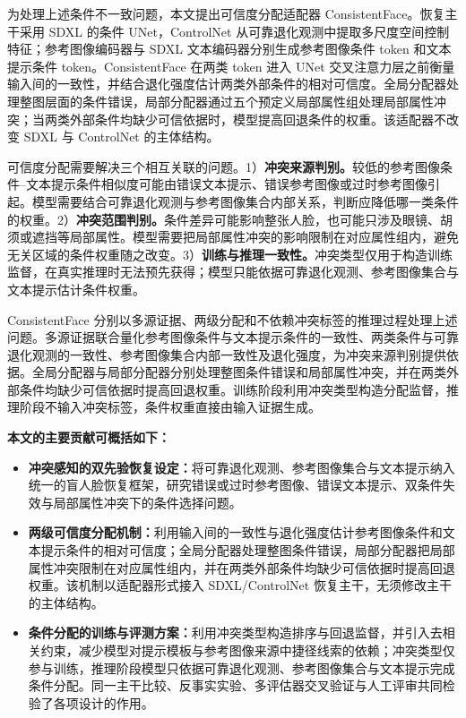 \documentclass[journal]{IEEEtran}
\begin{document}
为处理上述条件不一致问题，本文提出可信度分配适配器 ConsistentFace。恢复主干采用 SDXL 的条件 UNet，ControlNet 从可靠退化观测中提取多尺度空间控制特征；参考图像编码器与 SDXL 文本编码器分别生成参考图像条件 token 和文本提示条件 token。ConsistentFace 在两类 token 进入 UNet 交叉注意力层之前衡量输入间的一致性，并结合退化强度估计两类外部条件的相对可信度。全局分配器处理整图层面的条件错误，局部分配器通过五个预定义局部属性组处理局部属性冲突；当两类外部条件均缺少可信依据时，模型提高回退条件的权重。该适配器不改变 SDXL 与 ControlNet 的主体结构。

可信度分配需要解决三个相互关联的问题。1）\textbf{冲突来源判别。}较低的参考图像条件--文本提示条件相似度可能由错误文本提示、错误参考图像或过时参考图像引起。模型需要结合可靠退化观测与参考图像集合内部关系，判断应降低哪一类条件的权重。2）\textbf{冲突范围判别。}条件差异可能影响整张人脸，也可能只涉及眼镜、胡须或遮挡等局部属性。模型需要把局部属性冲突的影响限制在对应属性组内，避免无关区域的条件权重随之改变。3）\textbf{训练与推理一致性。}冲突类型仅用于构造训练监督，在真实推理时无法预先获得；模型只能依据可靠退化观测、参考图像集合与文本提示估计条件权重。

ConsistentFace 分别以多源证据、两级分配和不依赖冲突标签的推理过程处理上述问题。多源证据联合量化参考图像条件与文本提示条件的一致性、两类条件与可靠退化观测的一致性、参考图像集合内部一致性及退化强度，为冲突来源判别提供依据。全局分配器与局部分配器分别处理整图条件错误和局部属性冲突，并在两类外部条件均缺少可信依据时提高回退权重。训练阶段利用冲突类型构造分配监督，推理阶段不输入冲突标签，条件权重直接由输入证据生成。

\textbf{本文的主要贡献可概括如下：}

\begin{itemize}
    \item \textbf{冲突感知的双先验恢复设定：}将可靠退化观测、参考图像集合与文本提示纳入统一的盲人脸恢复框架，研究错误或过时参考图像、错误文本提示、双条件失效与局部属性冲突下的条件选择问题。

    \item \textbf{两级可信度分配机制：}利用输入间的一致性与退化强度估计参考图像条件和文本提示条件的相对可信度；全局分配器处理整图条件错误，局部分配器把局部属性冲突限制在对应属性组内，并在两类外部条件均缺少可信依据时提高回退权重。该机制以适配器形式接入 SDXL/ControlNet 恢复主干，无须修改主干的主体结构。

    \item \textbf{条件分配的训练与评测方案：}利用冲突类型构造排序与回退监督，并引入去相关约束，减少模型对提示模板与参考图像来源中捷径线索的依赖；冲突类型仅参与训练，推理阶段模型只依据可靠退化观测、参考图像集合与文本提示完成条件分配。同一主干比较、反事实实验、多评估器交叉验证与人工评审共同检验了各项设计的作用。
\end{itemize}
\end{document}

